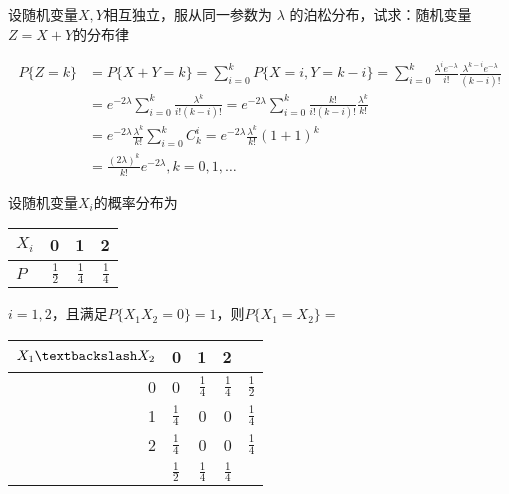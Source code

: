 \documentclass{article}
\begin{document}
\begin{examplle}[]
设随机变量\(X,Y\)相互独立，服从同一参数为 \(\lambda\) 的泊松分布，试求：随机变量
\(Z=X+Y\)的分布律

\begin{align*}
P\{Z=k\}&=P\{X+Y=k\}=\sum_{i=0}^kP\{X=i,Y=k-i\}=\sum_{i=0}^k
\frac{\lambda^i e^{-\lambda}}{i!}\frac{\lambda^{k-i}e^{-\lambda}}{(k-i)!}\\
&=e^{-2\lambda}\sum_{i=0}^k\frac{\lambda^k}{i!(k-i)!}=e^{-2\lambda}\sum_{i=0}^k
\frac{k!}{i!(k-i)!}\frac{\lambda^k}{k!}\\
&=e^{-2\lambda}\frac{\lambda^k}{k!}\sum_{i=0}^kC_k^i=e^{-2\lambda}\frac{\lambda^k}{k!}(1+1)^k\\
&=\frac{(2\lambda)^k}{k!}e^{-2\lambda},k=0,1,\dots
\end{align*}
\end{examplle}

\begin{examplle}[]
设随机变量\(X_i\)的概率分布为
\begin{center}
\begin{tabular}{l|rrr}
\(X_i\) & 0 & 1 & 2\\
\hline
\(P\) & \(\frac{1}{2}\) & \(\frac{1}{4}\) & \(\frac{1}{4}\)\\
\end{tabular}
\end{center}
\(i=1,2\)，且满足\(P\{X_1X_2=0\}=1\)，则\(P\{X_1=X_2\}=\)

\begin{center}
\begin{tabular}{r|lrr|l}
\(X_1\textbackslash X_2\) & 0 & 1 & 2 & \\
\hline
0 & 0 & \(\frac{1}{4}\) & \(\frac{1}{4}\) & \(\frac{1}{2}\)\\
1 & \(\frac{1}{4}\) & 0 & 0 & \(\frac{1}{4}\)\\
2 & \(\frac{1}{4}\) & 0 & 0 & \(\frac{1}{4}\)\\
\hline
 & \(\frac{1}{2}\) & \(\frac{1}{4}\) & \(\frac{1}{4}\) & \\
\end{tabular}
\end{center}
\end{examplle}

\begin{examplle}[]
   
\end{examplle}
\end{document}
